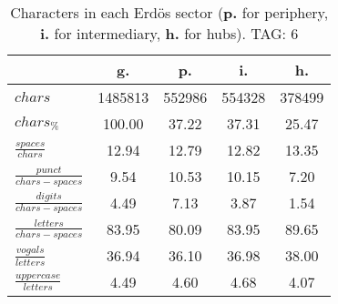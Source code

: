 \begin{table}[h!]
\begin{center}
\begin{tabular}{| l || c | c | c | c |}\hline
 & {\bf g.} & {\bf p.} & {\bf i.} & {\bf h.} \\\hline\hline
$chars$ & 1485813  & 552986  & 554328  & 378499 \\
$chars_{\%}$ & 100.00  & 37.22  & 37.31  & 25.47 \\\hline
$\frac{spaces}{chars}$ & 12.94  & 12.79  & 12.82  & 13.35 \\
$\frac{punct}{chars-spaces}$ & 9.54  & 10.53  & 10.15  & 7.20 \\
$\frac{digits}{chars-spaces}$ & 4.49  & 7.13  & 3.87  & 1.54 \\\hline
$\frac{letters}{chars-spaces}$ & 83.95  & 80.09  & 83.95  & 89.65 \\
$\frac{vogals}{letters}$ & 36.94  & 36.10  & 36.98  & 38.00 \\
$\frac{uppercase}{letters}$ & 4.49  & 4.60  & 4.68  & 4.07 \\\hline
\end{tabular}
\caption{Characters in each Erd\"os sector ({{\bf p.}} for periphery, {{\bf i.}} for intermediary, 
    {{\bf h.}} for hubs). TAG: 6}
\end{center}
\end{table}